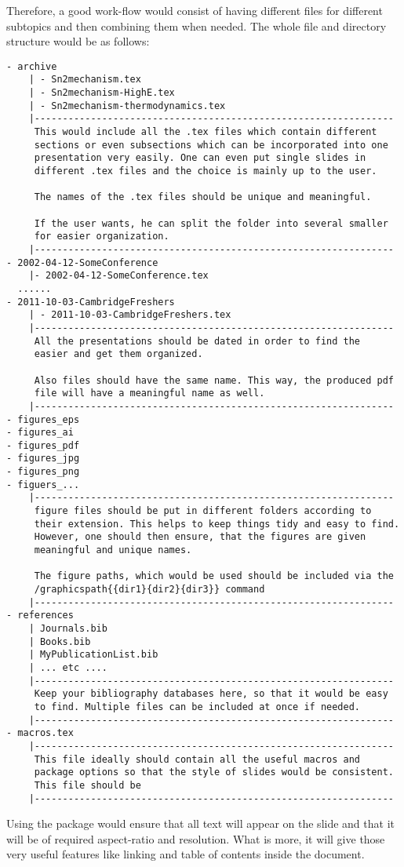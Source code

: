 \documentclass[
    draft
]{scrartcl}
\begin{document}
%
Therefore, a good work-flow would consist of having different  files
    for different subtopics and then combining them when needed.
%
The whole file and directory structure would be as follows:
\begin{lstlisting}
- archive
    | - Sn2mechanism.tex
    | - Sn2mechanism-HighE.tex
    | - Sn2mechanism-thermodynamics.tex
    |----------------------------------------------------------------
     This would include all the .tex files which contain different
     sections or even subsections which can be incorporated into one
     presentation very easily. One can even put single slides in
     different .tex files and the choice is mainly up to the user.

     The names of the .tex files should be unique and meaningful.

     If the user wants, he can split the folder into several smaller 
     for easier organization.
    |----------------------------------------------------------------
- 2002-04-12-SomeConference
    |- 2002-04-12-SomeConference.tex
  ......
- 2011-10-03-CambridgeFreshers
    | - 2011-10-03-CambridgeFreshers.tex
    |----------------------------------------------------------------
     All the presentations should be dated in order to find the
     easier and get them organized.
    
     Also files should have the same name. This way, the produced pdf
     file will have a meaningful name as well.
    |----------------------------------------------------------------
- figures_eps
- figures_ai
- figures_pdf
- figures_jpg
- figures_png
- figuers_...
    |----------------------------------------------------------------
     figure files should be put in different folders according to
     their extension. This helps to keep things tidy and easy to find.
     However, one should then ensure, that the figures are given
     meaningful and unique names.
    
     The figure paths, which would be used should be included via the
     /graphicspath{{dir1}{dir2}{dir3}} command
    |----------------------------------------------------------------
- references
    | Journals.bib
    | Books.bib
    | MyPublicationList.bib
    | ... etc ....
    |----------------------------------------------------------------
     Keep your bibliography databases here, so that it would be easy
     to find. Multiple files can be included at once if needed.
    |----------------------------------------------------------------
- macros.tex
    |----------------------------------------------------------------
     This file ideally should contain all the useful macros and
     package options so that the style of slides would be consistent.
     This file should be 
    |----------------------------------------------------------------
\end{lstlisting}
%
Using the  package would ensure that all text will appear on the
    slide and that it will be of required aspect-ratio and resolution.
%
What is more, it will give those very useful features like linking and table of
    contents inside the document.
%
\end{document}

